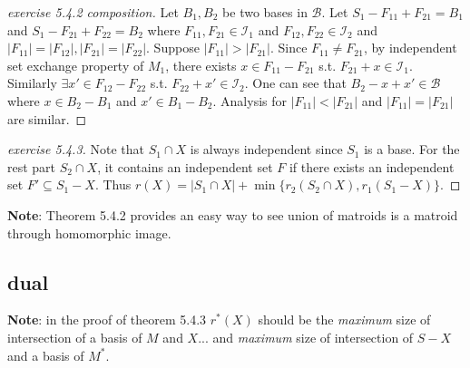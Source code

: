 \begin{proof}[exercise 5.4.2 composition]
    Let $B_1,B_2$ be two bases in $\mathcal B$. Let $S_1-F_{11}+F_{21}=B_1$ and $S_1-F_{21}+F_{22}=B_2$ where $F_{11},F_{21}\in \mathcal{I}_1$ and $F_{12},F_{22}\in \mathcal{I}_2$ and $|F_{11}|=|F_{12}|,|F_{21}|=|F_{22}|$. Suppose $|F_{11}|>|F_{21}|$. Since $F_{11}\not=F_{21}$, by independent set exchange property of $M_1$, there exists $x\in F_{11}-F_{21}$ s.t. $F_{21}+x\in \mathcal{I}_1$. Similarly $\exists x'\in F_{12}-F_{22}$ s.t. $F_{22}+x'\in \mathcal{I}_2$. One can see that $B_2-x+x'\in \mathcal{B}$ where $x\in B_2-B_1$ and $x'\in B_1-B_2$. Analysis for $|F_{11}|<|F_{21}|$ and $|F_{11}|=|F_{21}|$ are similar.
\end{proof}
\begin{proof}[exercise 5.4.3]
    Note that $S_1\cap X$ is always independent since $S_1$ is a base. For the rest part $S_2\cap X$, it contains an independent set $F$ if there exists an independent set $F'\subseteq S_1-X$. Thus $r(X)=|S_1\cap X|+\min\{r_2(S_2\cap X),r_1(S_1-X)\}$.
\end{proof}

\textbf{Note}: Theorem 5.4.2 provides an easy way to see union of matroids is a matroid through homomorphic image.

\subsection{dual}
\textbf{Note}: in the proof of theorem 5.4.3 $r^*(X)$ should be the \emph{maximum} size of intersection of a basis of $M$ and $X$... and \emph{maximum} size of intersection of $S-X$ and a basis of $M^*$.

